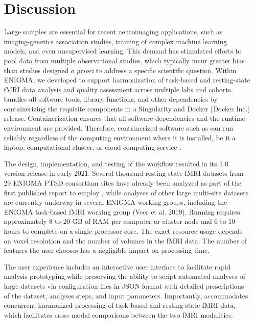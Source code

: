 \section{Discussion}

Large samples are essential for recent neuroimaging applications, such as
imaging-genetics association studies, training of complex machine learning
models, and even unsupervised learning. This demand has stimulated efforts
to pool data from multiple observational studies, which typically incur
greater bias than studies designed \emph{a priori} to address a specific
scientific question. Within ENIGMA, we developed  to support
harmonization of task-based and resting-state fMRI data analysis and
quality assessment across multiple labs and cohorts. 
bundles all software tools, library functions, and other dependencies by
containerizing the requisite components in a Singularity
\parencite{10.1371/journal.pone.0177459} and Docker (Docker Inc.) release.
Containerization ensures that all software dependencies and the runtime
environment are provided. Therefore, containerized software such as
 can run reliably regardless of the computing environment
where it is installed, be it a laptop, computational cluster, or cloud
computing service \parencite{10.1016/j.cels.2018.03.014}.

The design, implementation, and testing of the  workflow
resulted in its 1.0 version release in early 2021. Several thousand
resting-state fMRI datasets from 29 ENIGMA PTSD consortium sites have
already been analyzed as part of the first published report to employ
 \parencite{weis_thesis}, while analyses of other large
multi-site datasets are currently underway in several ENIGMA working
groups, including the ENIGMA task-based fMRI working group (Veer et al.
2019). Running  requires approximately 8 to 20 GB of RAM per
computer or cluster node and 6 to 10 hours to complete on a single
processor core. The exact resource usage depends on voxel resolution and
the number of volumes in the fMRI data. The number of features the user
chooses has a negligible impact on processing time.

The  user experience includes an interactive user interface
to facilitate rapid analysis prototyping while preserving the ability to
script automated analyses of large datasets via configuration files in JSON
format with detailed prescriptions of the dataset, analyses steps, and
input parameters. Importantly,  accommodates concurrent
harmonized processing of task-based and resting-state fMRI data, which
facilitates cross-modal comparisons between the two fMRI modalities.

